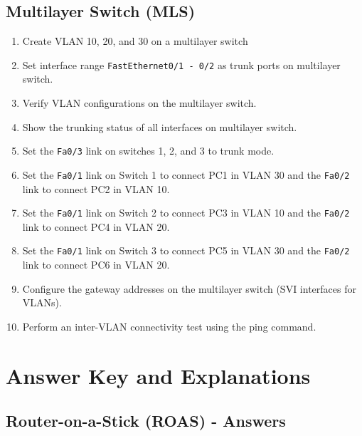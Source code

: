 \documentclass[a4paper]{book}
\begin{document}
\chapter{Multilayer Switch (MLS)}

\begin{enumerate}
    \item Create VLAN 10, 20, and 30 on a multilayer switch
    \item Set interface range \texttt{FastEthernet0/1 - 0/2} as trunk ports on multilayer switch.
    \item Verify VLAN configurations on the multilayer switch.
    \item Show the trunking status of all interfaces on multilayer switch.
    \item Set the \texttt{Fa0/3} link on switches 1, 2, and 3 to trunk mode.
    \item Set the \texttt{Fa0/1} link on Switch 1 to connect PC1 in VLAN 30 and the \texttt{Fa0/2} link to connect PC2 in VLAN 10.
    \item Set the \texttt{Fa0/1} link on Switch 2 to connect PC3 in VLAN 10 and the \texttt{Fa0/2} link to connect PC4 in VLAN 20.
    \item Set the \texttt{Fa0/1} link on Switch 3 to connect PC5 in VLAN 30 and the \texttt{Fa0/2} link to connect PC6 in VLAN 20.
    \item Configure the gateway addresses on the multilayer switch (SVI interfaces for VLANs).
    \item Perform an inter-VLAN connectivity test using the ping command.

    
\end{enumerate}

\part{Answer Key and Explanations}


\chapter{Router-on-a-Stick (ROAS) - Answers}
\end{document}
